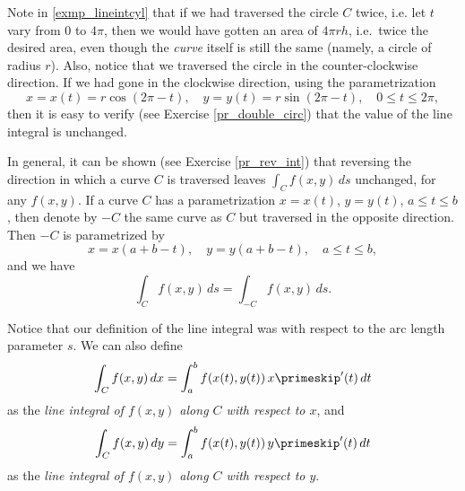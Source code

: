 Note in \autoref{exmp_lineintcyl} that if we had traversed the circle $C$ twice, i.e. let $t$ vary from $0$ to $4\pi$, then we would have gotten an area of $4\pi r h$, i.e.\ twice the desired area, even though the \emph{curve} itself is still the same (namely, a circle of radius $r$). Also, notice that we traversed the circle in the counter-clockwise direction. If we had gone in the clockwise direction, using the parametrization
\begin{equation}\label{eqn:lineintcylcwise}
 x = x(t) = r \cos (2\pi - t) ,\quad y = y(t) = r \sin (2\pi - t),\quad 0 \le t \le 2\pi ,
\end{equation}
then it is easy to verify (see Exercise \ref{pr_double_circ}) that the value of the line integral is unchanged.

In general, it can be shown (see Exercise \ref{pr_rev_int}) that reversing the direction in which a curve $C$ is traversed leaves $\int_C f(x,y)\,ds$ unchanged, for any $f(x,y)$. If a curve $C$ has a parametrization $x=x(t)$, $y=y(t)$, $a \le t \le b$, then denote by $-C$ the same curve as $C$ but traversed in the opposite direction. Then $-C$ is parametrized by
\begin{equation}\label{eqn:reversec}
 x = x(a+b-t),\quad y = y(a+b-t),\quad a \le t \le b ,
\end{equation}
and we have
\[\int_C f(x,y)\,ds = \int_{-C} f(x,y)\,ds .\]

Notice that our definition of the line integral was with respect to the arc length parameter $s$. We can also define
\[
 \int_C f(x,y)\,dx = \int_a^b f(x(t),y(t)) \,x\primeskip'(t)\,dt
\]
as the \emph{line integral of $f(x,y)$ along $C$ with respect to $x$}, and
\[
 \int_C f(x,y)\,dy = \int_a^b f(x(t),y(t)) \,y\primeskip'(t)\,dt
\]
as the \emph{line integral of $f(x,y)$ along $C$ with respect to $y$}.

